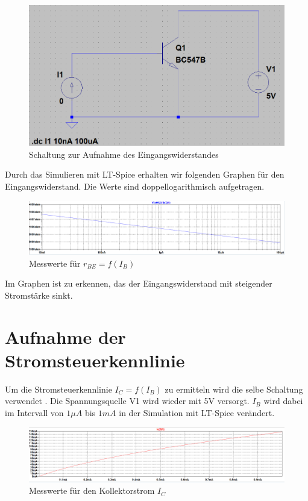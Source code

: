         \begin{figure}[!ht]
        \centering
        \includegraphics[width=0.5\linewidth]{Bilder/22aufbau.PNG}
        \caption{Schaltung zur Aufnahme des Eingangswiderstandes}
        \label{fig:22}
        \end{figure}

        Durch das Simulieren mit LT-Spice erhalten wir folgenden Graphen für den Eingangswiderstand. Die Werte sind doppellogarithmisch aufgetragen.

        \begin{figure}[!ht]
            \centering
            \includegraphics[width=\linewidth]{Bilder/22graph.PNG}
            \caption{Messwerte für \(r_{BE}=f(I_B)\)}
        \end{figure}

        Im Graphen ist zu erkennen, das der Eingangswiderstand mit steigender Stromstärke sinkt.

        \newpage
    \section{Aufnahme der Stromsteuerkennlinie}
        Um die Stromsteuerkennlinie \(I_C=f(I_B)\) zu ermitteln wird die selbe Schaltung verwendet . Die Spannungsquelle V1 wird wieder mit 5V versorgt. \(I_B\) wird dabei im Intervall von \(1\mu A\) bis \(1mA\) in der Simulation mit LT-Spice verändert. 

        \begin{figure}[!ht]
            \centering
            \includegraphics[width=\linewidth]{Bilder/23graph.PNG}
            \caption{Messwerte für den Kollektorstrom \(I_C\)}
        \end{figure}

